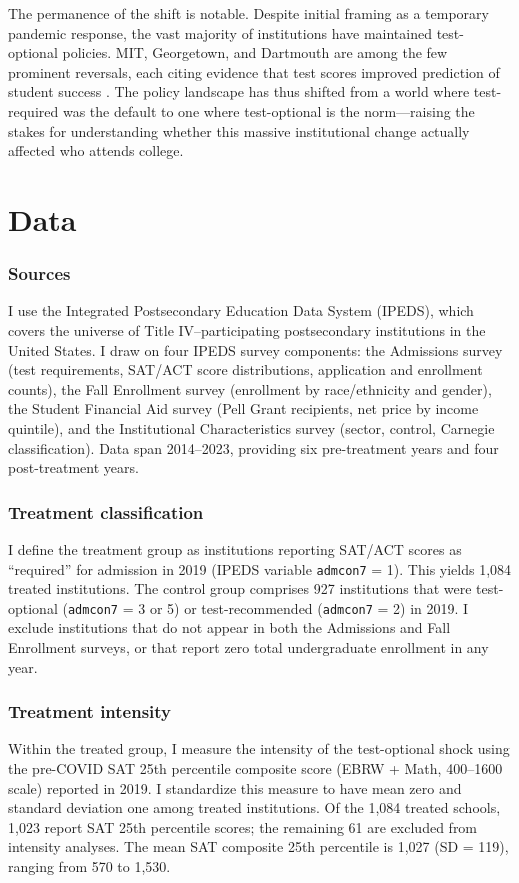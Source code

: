 \documentclass[12pt]{article}
\begin{document}
The permanence of the shift is notable. Despite initial framing as a temporary pandemic response, the vast majority of institutions have maintained test-optional policies. MIT, Georgetown, and Dartmouth are among the few prominent reversals, each citing evidence that test scores improved prediction of student success \citep{Chetty2023Diversifying}. The policy landscape has thus shifted from a world where test-required was the default to one where test-optional is the norm---raising the stakes for understanding whether this massive institutional change actually affected who attends college.


\section{Data}
\label{sec:data}

\subsubsection*{Sources} I use the Integrated Postsecondary Education Data System (IPEDS), which covers the universe of Title IV--participating postsecondary institutions in the United States. I draw on four IPEDS survey components: the Admissions survey (test requirements, SAT/ACT score distributions, application and enrollment counts), the Fall Enrollment survey (enrollment by race/ethnicity and gender), the Student Financial Aid survey (Pell Grant recipients, net price by income quintile), and the Institutional Characteristics survey (sector, control, Carnegie classification). Data span 2014--2023, providing six pre-treatment years and four post-treatment years.

\subsubsection*{Treatment classification} I define the treatment group as institutions reporting SAT/ACT scores as ``required'' for admission in 2019 (IPEDS variable \texttt{admcon7} = 1). This yields 1,084 treated institutions. The control group comprises 927 institutions that were test-optional (\texttt{admcon7} = 3 or 5) or test-recommended (\texttt{admcon7} = 2) in 2019. I exclude institutions that do not appear in both the Admissions and Fall Enrollment surveys, or that report zero total undergraduate enrollment in any year.

\subsubsection*{Treatment intensity} Within the treated group, I measure the intensity of the test-optional shock using the pre-COVID SAT 25th percentile composite score (EBRW + Math, 400--1600 scale) reported in 2019. I standardize this measure to have mean zero and standard deviation one among treated institutions. Of the 1,084 treated schools, 1,023 report SAT 25th percentile scores; the remaining 61 are excluded from intensity analyses. The mean SAT composite 25th percentile is 1,027 (SD = 119), ranging from 570 to 1,530.
\end{document}
